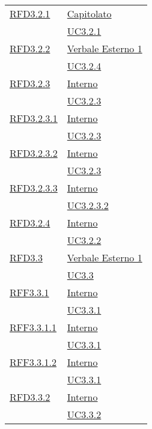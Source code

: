 \begin{longtable}{|>{\centering}m{5cm}|m{5cm}<{\centering}|}
\hyperlink{RFD3.2.1}{RFD3.2.1} & \hyperlink{Capitolato}{Capitolato}\\
& \hyperref[UC3.2.1]{UC3.2.1}\\ \hline

\hyperlink{RFD3.2.2}{RFD3.2.2} & \hyperlink{Verbale Esterno 1}{Verbale Esterno 1}\\
& \hyperref[UC3.2.4]{UC3.2.4}\\ \hline

\hyperlink{RFD3.2.3}{RFD3.2.3} & \hyperlink{Interno}{Interno}\\
& \hyperref[UC3.2.3]{UC3.2.3}\\ \hline

\hyperlink{RFD3.2.3.1}{RFD3.2.3.1} & \hyperlink{Interno}{Interno}\\
& \hyperref[UC3.2.3]{UC3.2.3}\\ \hline

\hyperlink{RFD3.2.3.2}{RFD3.2.3.2} & \hyperlink{Interno}{Interno}\\
& \hyperref[UC3.2.3]{UC3.2.3}\\ \hline

\hyperlink{RFD3.2.3.3}{RFD3.2.3.3} & \hyperlink{Interno}{Interno}\\
& \hyperref[UC3.2.3.2]{UC3.2.3.2}\\ \hline

\hyperlink{RFD3.2.4}{RFD3.2.4} & \hyperlink{Interno}{Interno}\\
& \hyperref[UC3.2.2]{UC3.2.2}\\ \hline

\hyperlink{RFD3.3}{RFD3.3} & \hyperlink{Verbale Esterno 1}{Verbale Esterno 1}\\
& \hyperref[UC3.3]{UC3.3}\\ \hline

\hyperlink{RFF3.3.1}{RFF3.3.1} & \hyperlink{Interno}{Interno}\\
& \hyperref[UC3.3.1]{UC3.3.1}\\ \hline

\hyperlink{RFF3.3.1.1}{RFF3.3.1.1} & \hyperlink{Interno}{Interno}\\
& \hyperref[UC3.3.1]{UC3.3.1}\\ \hline

\hyperlink{RFF3.3.1.2}{RFF3.3.1.2} & \hyperlink{Interno}{Interno}\\
& \hyperref[UC3.3.1]{UC3.3.1}\\ \hline

\hyperlink{RFD3.3.2}{RFD3.3.2} & \hyperlink{Interno}{Interno}\\
& \hyperref[UC3.3.2]{UC3.3.2}\\ \hline


\end{longtable}
